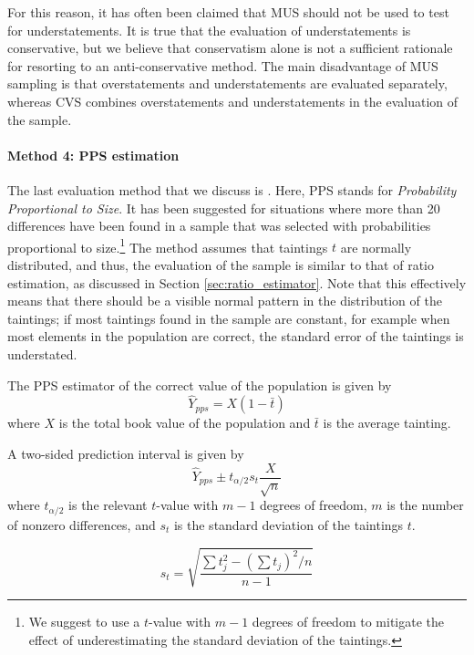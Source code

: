 For this reason, it has often been claimed that MUS should not be used to test for understatements. It is true that the evaluation of understatements is conservative, but we believe that conservatism alone is not a sufficient rationale for resorting to an anti-conservative method. The main disadvantage of MUS sampling is that overstatements and understatements are evaluated separately, whereas CVS combines overstatements and understatements in the evaluation of the sample.

\paragraph{Method 4: PPS estimation} \label{par:pps_estimation}
The last evaluation method that we discuss is . Here, PPS stands for \emph{Probability Proportional to Size}. 
It has been suggested for situations where more than 20 differences have been found in a sample that was selected with probabilities proportional to size.\footnote{We suggest to use a $t$-value with $m - 1$ degrees of freedom to mitigate the effect of underestimating the standard deviation of the taintings.} The method assumes that taintings $t$ are normally distributed, and thus, the evaluation of the sample is similar to that of ratio estimation, as discussed in Section \ref{sec:ratio_estimator}. Note that this effectively means that there should be a visible normal pattern in the distribution of the taintings; if most taintings found in the sample are constant, for example when most elements in the population are correct, the standard error of the taintings is understated.

\bigskip
The PPS estimator of the correct value of the population is given by
\begin{equation}
\hat{Y}_{pps} = X (1 - \bar{t})
\label{eq:pps_estimate}
\end{equation}
where $X$ is the total book value of the population and $\bar{t}$ is the average tainting. 

\bigskip
A two-sided prediction interval is given by
\begin{equation}
  \hat{Y}_{pps} \pm t_{\alpha/2} s_t \frac{X}{\sqrt{n}}
\label{eq:pred_interval_pps}
\end{equation}
where $t_{\alpha/2}$ is the relevant $t$-value with $m - 1$ degrees of freedom, $m$ is the number of nonzero differences, and $s_t$ is the standard deviation of the taintings $t$.

\begin{equation}
s_{t} = \sqrt{\frac{\sum{t_j^2} - (\sum{t_j})^2/n}{n - 1}}
\label{eq:sd_t}
\end{equation}

